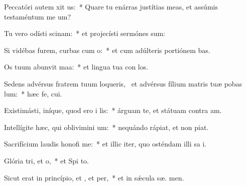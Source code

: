\item Peccatóri autem xit us:~* Quare tu enárras justítias meas, et assúmis testaméntum me   um?
\item Tu vero odísti scinam:~* et projecísti sermónes  sum:
\item Si vidébas furem, curbas cum o:~* et cum adúlteris portiónem  bas.
\item Os tuum abunvit maa:~* et lingua tua con los.
\item Sedens advérsus fratrem tuum loqueris,~\pscross{} et advérsus fílium matris tuæ pobas lum:~* hæc fe,  cui.
\item Existimásti, iníque, quod ero i lis:~* árguam te, et státuam contra  am.
\item Intellígite hæc, qui oblivimini um:~* nequándo rápiat, et non   piat.
\item Sacrifícium laudis honofi me:~* et illic iter, quo osténdam illi sa i.
\item Glória tri, et o,~* et Spi to.
\item Sicut erat in princípio, et , et per,~* et in sǽcula sæ. men.
